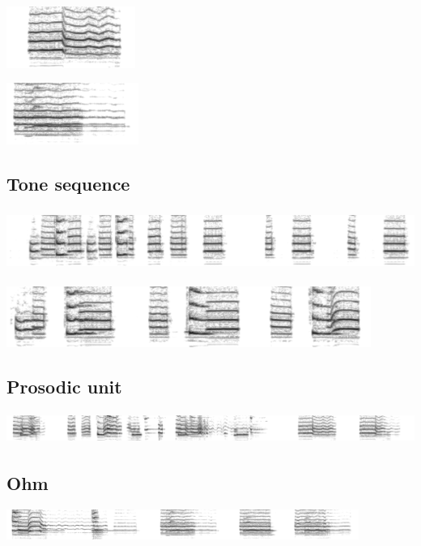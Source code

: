\includegraphics[height=2cm]{images/chico-output-pair-high-low}

\includegraphics[height=2cm]{images/chico-output-ohm}

\subsection{Tone sequence}

\includegraphics[height=2cm]{images/chico-separate-begin}

\includegraphics[height=2cm]{images/chico-separate-together}

\subsection{Prosodic unit}

\includegraphics[height=1cm]{images/chico-pair}

\subsection{Ohm}

\includegraphics[height=1cm]{images/chico-ohm}




